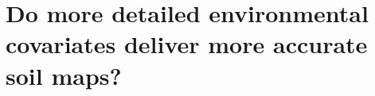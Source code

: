 \artigotrue
\chapter{Do more detailed environmental covariates deliver more accurate soil maps?}
\label{chap:chapter01}

\graphicspath{{chap/fig/}}

\def\elev{\texttt{ELEV}} %
\def\slp{\texttt{SLP}}   %
\def\asp{\texttt{ASP}}   %
\def\nor{\texttt{NOR}}   %
\def\acc{\texttt{ACC}}   %
\def\twi{\texttt{TWI}}   %
\def\spi{\texttt{SPI}}   %
\def\tpi{\texttt{TPI}}   %
\def\ndvi{\texttt{NDVI}} %
\def\savi{\texttt{SAVI}} %
\def\sibcs{Brazilian System of Soil Classification}

